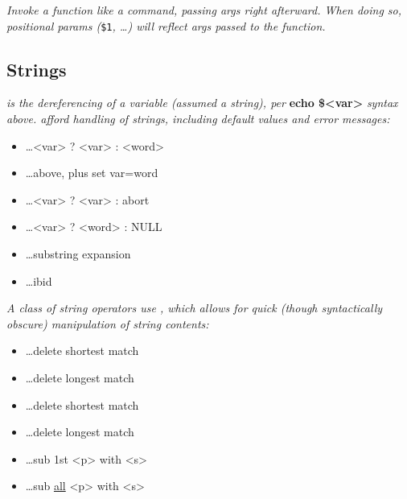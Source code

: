 \textit{Invoke a function like a command, passing args right afterward. When doing so, positional params (}\texttt{\$1}\textit{, \dots ) will reflect args passed to the function.}\\


\subsection*{Strings}

\textit{ is the dereferencing of a variable (assumed a string), per }\textbf{echo \$<var>}\textit{ syntax above.  afford handling of strings, including default values and error messages:}
{\footnotesize \begin{itemize}[leftmargin=*,label=-]
    \item {} \dots <var> ? <var> : <word>
    \item {} \dots above, plus set var=word
    \item {} \dots <var> ? <var> : abort
    \item {} \dots <var> ? <word> : NULL
    \item {} \dots substring expansion
    \item {} \dots ibid
\end{itemize}}
\vspace{2mm}

\textit{A class of string operators use , which allows for quick (though syntactically obscure) manipulation of string contents:}
{\footnotesize \begin{itemize}[leftmargin=*,label=-]
    \item {} \dots delete shortest match
    \item {} \dots delete longest match
    \item {} \dots delete shortest match
    \item {} \dots delete longest match
    \item {} \dots sub 1st <p> with <s>
    \item {} \dots sub \ul{all} <p> with <s>
\end{itemize}}
\vspace{2mm}

